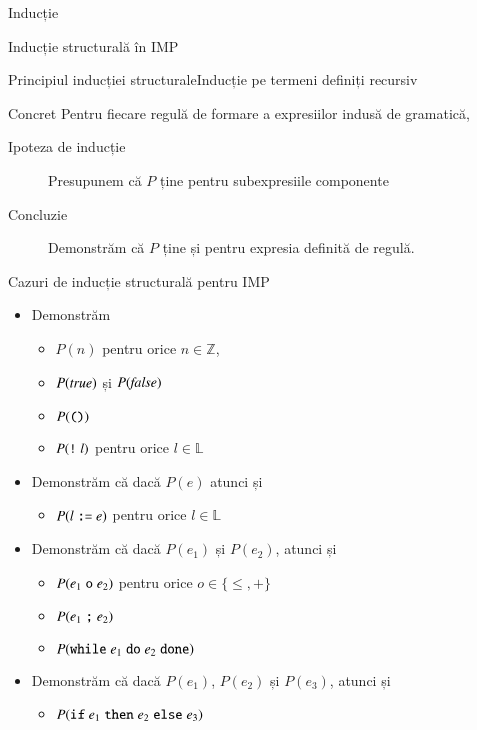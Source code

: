 \documentclass[xcolor=pdftex,romanian,colorlinks]{beamer}
\begin{document}
\begin{section}{Inducție}
\begin{subsection}{Inducție structurală în IMP}
\begin{frame}{Principiul inducției structurale}{Inducție pe termeni definiți recursiv}
\begin{block}{Concret} 
Pentru fiecare regulă de formare a expresiilor indusă de gramatică, 
\begin{description} 
\item[Ipoteza de inducție]  Presupunem că $P$ ține pentru subexpresiile componente
\item[Concluzie] Demonstrăm că $P$ ține și pentru expresia definită de regulă.
\end{description}	
\end{block}

\end{frame}

\begin{frame}{Cazuri de inducție structurală pentru IMP}
\begin{itemize}
\item[]  
Demonstrăm
\begin{itemize}
\item $P(n)$ pentru orice $n \in \mathbb{Z}$,
\item $P({\it true})$ și $P({\it false})$
\item $P(\mathrel{\text{\ttfamily ()}})$
\item$P(\mathrel{\text{\ttfamily !}} l)$ pentru orice $l\in \mathbb{L}$
\end{itemize}

\item[]   
Demonstrăm că dacă $P(e)$ atunci și
\begin{itemize}
\item $P(l \mathrel{\text{\ttfamily :=}} e)$ pentru orice $l \in \mathbb{L}$
\end{itemize}
\item[] 
Demonstrăm că dacă $P(e_1)$ și $P(e_2)$, atunci și
\begin{itemize}
\item $P(e_1 \mathrel{\text{\ttfamily o}} e_2)$ pentru orice $o \in \{\leq, +\}$
\item $P(e_1 \mathrel{\text{\ttfamily ;}} e_2)$
\item $P(\mathrel{\text{\ttfamily while}} e_1 \mathrel{\text{\ttfamily do}} e_2 \mathrel{\text{\ttfamily done}})$ 
\end{itemize}
\item[]
Demonstrăm că dacă $P(e_1)$, $P(e_2)$ și $P(e_3)$, atunci și 
\begin{itemize}
\item $P(\mathrel{\text{\ttfamily if}} e_1 \mathrel{\text{\ttfamily then}} e_2 \mathrel{\text{\ttfamily else}} e_3)$ 
\end{itemize}
\end{itemize}
\end{frame}


\end{subsection}
\end{section}
\end{document}
